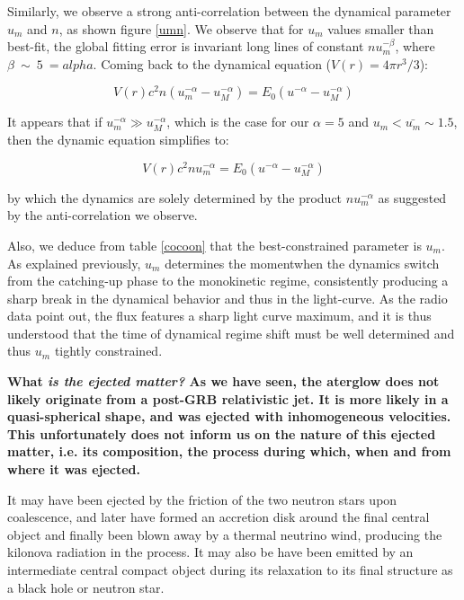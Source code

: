 
Similarly, we observe a strong anti-correlation between the dynamical parameter $u_m$ and $n$, as shown figure \ref{umn}. We observe that for $u_m$ values smaller than best-fit, the global fitting error is invariant long lines of constant $nu_m^{-\beta}$, where $\beta~\sim~5~=alpha$. Coming back to the dynamical equation ($V(r) = 4\pi r^3/3$):

$$V(r)c^2 n (u_m^{-\alpha} - u_M^{-\alpha}) = E_0 (u^{-\alpha} - u_M^{-\alpha}) $$

It appears that if $u_m^{-\alpha} \gg u_M^{-\alpha}$, which is the case for our $\alpha = 5$ and $u_m < \bar{u_m} \sim 1.5$, then the dynamic equation simplifies to:

$$V(r)c^2 n u_m^{-\alpha} = E_0 (u^{-\alpha} - u_M^{-\alpha}) $$

by which the dynamics are solely determined by the product $n u_m^{-\alpha}$ as suggested by the anti-correlation we observe.

Also, we deduce from table \ref{cocoon} that the best-constrained parameter is $u_m$. As explained previously, $u_m$ determines the momentwhen the dynamics switch from the catching-up phase to the monokinetic regime, consistently producing a sharp break in the dynamical behavior and thus in the light-curve. As the radio data point out, the flux features a sharp light curve maximum, and it is thus understood that the time of dynamical regime shift must be well determined and thus $u_m$ tightly constrained. 

\bf{What \it{is} the ejected matter? }As we have seen, the aterglow does not likely originate from a post-GRB relativistic jet. It is more likely in a quasi-spherical shape, and was ejected with inhomogeneous velocities. This unfortunately does not inform us on the nature of this ejected matter, i.e. its composition, the process during which, when and from where it was ejected.

It may have been ejected by the friction of the two neutron stars upon coalescence, and later have formed an accretion disk around the final central object and finally been blown away by a thermal neutrino wind, producing the kilonova radiation in the process. It may also be have been emitted by an intermediate central compact object during its relaxation to its final structure as a black hole or neutron star. 

